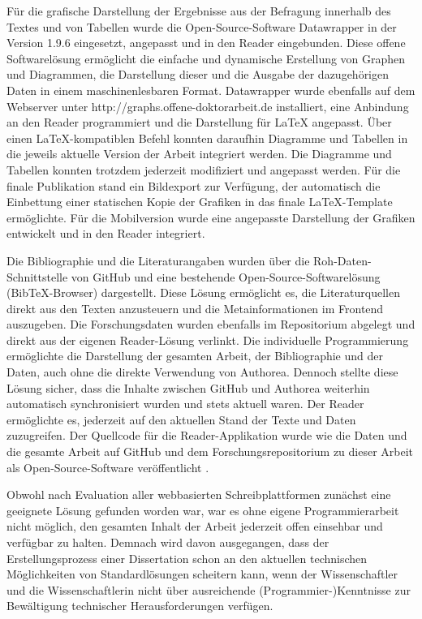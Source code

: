 Für die grafische Darstellung der Ergebnisse aus der Befragung innerhalb des Textes und von Tabellen wurde die Open-Source-Software Datawrapper \cite{Datawrapper_2015} in der Version 1.9.6 eingesetzt, angepasst und in den Reader eingebunden. Diese offene Softwarelösung ermöglicht die einfache und dynamische Erstellung von Graphen und Diagrammen, die Darstellung dieser und die Ausgabe der dazugehörigen Daten in einem maschinenlesbaren Format. Datawrapper wurde ebenfalls auf dem Webserver unter http://graphs.offene-doktorarbeit.de installiert, eine Anbindung an den Reader programmiert und die Darstellung für LaTeX angepasst. Über einen LaTeX-kompatiblen Befehl konnten daraufhin Diagramme und Tabellen in die jeweils aktuelle Version der Arbeit integriert werden. Die Diagramme und Tabellen konnten trotzdem jederzeit modifiziert und angepasst werden. Für die finale Publikation stand ein Bildexport zur Verfügung, der automatisch die Einbettung einer statischen Kopie der Grafiken in das finale LaTeX-Template ermöglichte. Für die Mobilversion wurde eine angepasste Darstellung der Grafiken entwickelt und in den Reader integriert.

Die Bibliographie und die Literaturangaben wurden über die Roh-Daten-Schnittstelle von GitHub und eine bestehende Open-Source-Softwarelösung (BibTeX-Browser) dargestellt. Diese Lösung ermöglicht es, die Literaturquellen direkt aus den Texten anzusteuern und die Metainformationen im Frontend auszugeben. Die Forschungsdaten wurden ebenfalls im Repositorium abgelegt und direkt aus der eigenen Reader-Lösung verlinkt. Die individuelle Programmierung ermöglichte die Darstellung der gesamten Arbeit, der Bibliographie und der Daten, auch ohne die direkte Verwendung von Authorea. Dennoch stellte diese Lösung sicher, dass die Inhalte zwischen GitHub und Authorea weiterhin automatisch synchronisiert wurden und stets aktuell waren. Der Reader ermöglichte es, jederzeit auf den aktuellen Stand der Texte und Daten zuzugreifen. Der Quellcode für die Reader-Applikation wurde wie die Daten und die gesamte Arbeit auf GitHub und dem Forschungsrepositorium zu dieser Arbeit als Open-Source-Software veröffentlicht \cite{Heise_2015c}.

Obwohl nach Evaluation aller webbasierten Schreibplattformen zunächst eine geeignete Lösung gefunden worden war, war es ohne eigene Programmierarbeit nicht möglich, den gesamten Inhalt der Arbeit jederzeit offen einsehbar und verfügbar zu halten. Demnach wird davon ausgegangen, dass der Erstellungsprozess einer Dissertation schon an den aktuellen technischen Möglichkeiten von Standardlösungen scheitern kann, wenn der Wissenschaftler und die Wissenschaftlerin nicht über ausreichende (Programmier-)Kenntnisse zur Bewältigung technischer Herausforderungen verfügen.

